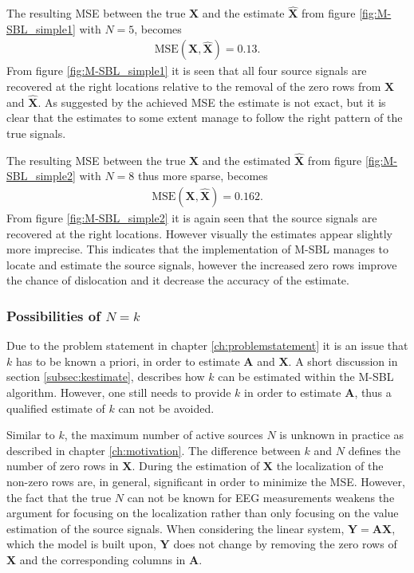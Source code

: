 \noindent
The resulting MSE between the true $\mathbf{X}$ and the estimate $\hat{\mathbf{X}}$ from figure \ref{fig:M-SBL_simple1} with $N = 5$, becomes 
\begin{align*}
\text{MSE}(\mathbf{X}, \hat{\mathbf{X}}) = 0.13.
\end{align*}
From figure \ref{fig:M-SBL_simple1} it is seen that all four source signals are recovered at the right locations relative to the removal of the zero rows from $\mathbf{X}$ and $\hat{\mathbf{X}}$. 
As suggested by the achieved MSE the estimate is not exact, but it is clear that the estimates to some extent manage to follow the right pattern of the true signals. 

The resulting MSE between the true $\mathbf{X}$ and the estimated $\hat{\mathbf{X}}$ from figure \ref{fig:M-SBL_simple2} with $N = 8$ thus more sparse, becomes 
\begin{align*}
\text{MSE}(\mathbf{X}, \hat{\mathbf{X}}) = 0.162. 
\end{align*}
From figure \ref{fig:M-SBL_simple2} it is again seen that the source signals are recovered at the right locations. 
However visually the estimates appear slightly more imprecise. 
This indicates that the implementation of M-SBL manages to locate and estimate the source signals, however the increased zero rows improve the chance of dislocation and it decrease the accuracy of the estimate.     

\subsubsection*{Possibilities of $N=k$}
Due to the problem statement in chapter \ref{ch:problemstatement} it is an issue that $k$ has to be known a priori, in order to estimate $\mathbf{A}$ and $\mathbf{X}$. 
A short discussion in section \ref{subsec:kestimate}, describes how $k$ can be estimated within the M-SBL algorithm. 
However, one still needs to provide $k$ in order to estimate $\mathbf{A}$, thus a qualified estimate of $k$ can not be avoided. 

Similar to $k$, the maximum number of active sources $N$ is unknown in practice as described in chapter \ref{ch:motivation}. 
The difference between $k$ and $N$ defines the number of zero rows in $\mathbf{X}$.
During the estimation of $\mathbf{X}$ the localization of the non-zero rows are, in general, significant in order to minimize the MSE. 
However, the fact that the true $N$ can not be known for EEG measurements weakens the argument for focusing on the localization rather than only focusing on the value estimation of the source signals. 
When considering the linear system, $\mathbf{Y} = \mathbf{AX}$, which the model is built upon, $\mathbf{Y}$ does not change by removing the zero rows of $\mathbf{X}$ and the corresponding columns in $\mathbf{A}$.

